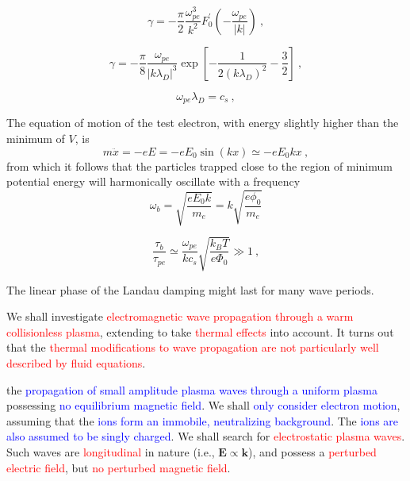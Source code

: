 \documentclass[12pt,a4paper]{article}
\renewcommand{\vec}[1]{\boldsymbol{#1}}
\begin{document}
\begin{equation}
\gamma = -\frac{\pi}{2} \frac{\omega_{pe}^3}{k^2} F^\prime_0\left(-\dfrac{\omega_{pe}}{|k|} \right) ~,
\end{equation}


\begin{equation}
\gamma = -\frac{\pi}{8} \frac{\omega_{pe}}{|k \lambda_D|^3} \exp\left[-\dfrac{1}{2(k\lambda_D)^2} -\dfrac{3}{2} \right] ~,
\end{equation}

\begin{equation*}
\omega_{pe} \lambda_D = c_s ~,
\end{equation*}


The equation of motion of the test electron, with energy slightly higher than the minimum of $V$, is
\begin{equation*}
m\ddot{x} = -eE = -eE_0 \sin(kx) \simeq -eE_0 k x ~,
\end{equation*}
from which it follows that the particles trapped close to the region of minimum potential energy will harmonically oscillate with a frequency
\begin{equation*}
\omega_b = \sqrt{\dfrac{eE_0 k}{m_e} } = k \sqrt{\dfrac{e\phi_0}{m_e} }
\end{equation*}

\begin{equation*}
\dfrac{\tau_b}{\tau_{pe}} \simeq \frac{\omega_{pe}}{k c_s} \sqrt{\frac{k_B T}{e \Phi_0} } \gg 1 ~,
\end{equation*}



The linear phase of the Landau damping might last for many wave periods.

\cite{Plasma2014} We shall investigate \textcolor{red}{electromagnetic wave propagation through a warm collisionless plasma}, extending to take \textcolor{red}{thermal effects} into account. It turns out that the \textcolor{red}{thermal modifications to wave propagation are not particularly well described by fluid equations}.

 the \textcolor{blue}{propagation of small amplitude plasma waves through a uniform plasma} possessing \textcolor{blue}{no equilibrium magnetic field}. We shall \textcolor{blue}{only consider electron motion}, assuming that the \textcolor{blue}{ions form an immobile, neutralizing background}. The \textcolor{blue}{ions are also assumed to be singly charged}. We shall search for \textcolor{red}{electrostatic plasma waves}. Such waves are \textcolor{red}{longitudinal} in nature (i.e., $\vec{E} \propto \vec{k}$), and possess a \textcolor{red}{perturbed electric field}, but \textcolor{red}{no perturbed magnetic field}.
\end{document}
